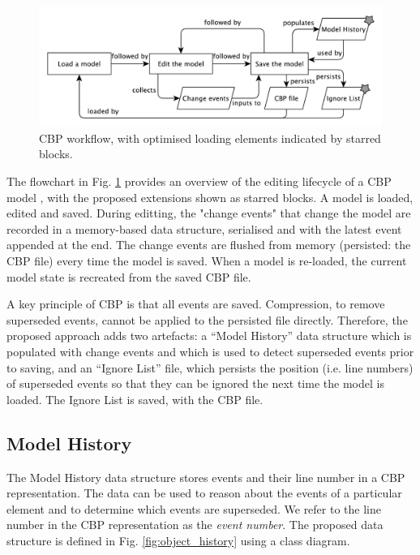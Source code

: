 \documentclass{llncs}
\begin{document}
    \begin{figure}[ht]
        \centering
        \includegraphics[width=\linewidth]{flowchart}
        \caption{CBP workflow, with optimised loading elements indicated by starred blocks.}
        \label{fig:flowchart}
    \end{figure}

    The flowchart in Fig. \ref{fig:flowchart} provides an overview of the editing lifecycle of a CBP model \cite{yohannis2017turning}, with the proposed extensions shown as starred blocks.  A model is loaded, edited and saved.  During editting, the "change events" that change the model are recorded in a memory-based data structure, serialised and with the latest event appended at the end.  The change events are flushed from memory (persisted: the CBP file) every time the model is saved.  When a model is re-loaded, the current model state is recreated from the saved CBP file.
    
    A key principle of CBP is that all events are saved.  Compression, to remove superseded events, cannot be applied to the persisted file directly.  Therefore, the proposed approach adds two artefacts: a ``Model History'' data structure which is populated with change events and which is used to detect superseded events prior to saving, and an ``Ignore List'' file, which persists the position (i.e. line numbers) of superseded events so that they can be ignored the next time the model is loaded.  The Ignore List is saved, with the CBP file.
    
    \subsection{Model History}
    \label{subsec:model_history}
    The Model History data structure stores events and their line number in a CBP representation.  The data can be used to reason about the events of a particular element and to determine which events are superseded.  We refer to the line number in the CBP representation as the \emph{event number}.
    The proposed data structure is defined in Fig. \ref{fig:object_history} using a class diagram.  
     
\end{document}
